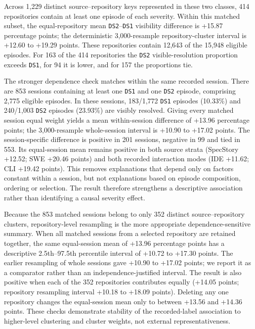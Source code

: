 Across 1,229 distinct source--repository keys represented in these two classes, 414 repositories contain at least one episode of each severity. Within this matched subset, the equal-repository mean \texttt{DS2}--\texttt{DS1} visibility difference is +15.87 percentage points; the deterministic 3,000-resample repository-cluster interval is +12.60 to +19.29 points. These repositories contain 12,643 of the 15,948 eligible episodes. For 163 of the 414 repositories the \texttt{DS2} visible-resolution proportion exceeds \texttt{DS1}, for 94 it is lower, and for 157 the proportions tie.

The stronger dependence check matches within the same recorded session. There are 853 sessions containing at least one \texttt{DS1} and one \texttt{DS2} episode, comprising 2,775 eligible episodes. In these sessions, 183/1,772 \texttt{DS1} episodes (10.33\%) and 240/1,003 \texttt{DS2} episodes (23.93\%) are visibly resolved. Giving every matched session equal weight yields a mean within-session difference of +13.96 percentage points; the 3,000-resample whole-session interval is +10.90 to +17.02 points. The session-specific difference is positive in 201 sessions, negative in 99 and tied in 553. Its equal-session mean remains positive in both source strata (SpecStory +12.52; SWE +20.46 points) and both recorded interaction modes (IDE +11.62; CLI +19.42 points). This removes explanations that depend only on factors constant within a session, but not explanations based on episode composition, ordering or selection. The result therefore strengthens a descriptive association rather than identifying a causal severity effect.

Because the 853 matched sessions belong to only 352 distinct source--repository clusters, repository-level resampling is the more appropriate dependence-sensitive summary. When all matched sessions from a selected repository are retained together, the same equal-session mean of +13.96 percentage points has a descriptive 2.5th--97.5th percentile interval of +10.72 to +17.30 points. The earlier resampling of whole sessions gave +10.90 to +17.02 points; we report it as a comparator rather than an independence-justified interval. The result is also positive when each of the 352 repositories contributes equally (+14.05 points; repository resampling interval +10.18 to +18.09 points). Deleting any one repository changes the equal-session mean only to between +13.56 and +14.36 points. These checks demonstrate stability of the recorded-label association to higher-level clustering and cluster weights, not external representativeness.

